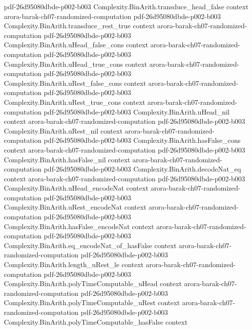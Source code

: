 \begin{theorem}
  {pdf-26d95080dbde-p002-b003}
\proofstep
  {Complexity.BinArith.transduce_head_false}
  {context}
  {arora-barak-ch07-randomized-computation}
  {pdf-26d95080dbde-p002-b003}
\proofstep
  {Complexity.BinArith.transduce_rest_true}
  {context}
  {arora-barak-ch07-randomized-computation}
  {pdf-26d95080dbde-p002-b003}
\proofstep
  {Complexity.BinArith.uHead_false_cons}
  {context}
  {arora-barak-ch07-randomized-computation}
  {pdf-26d95080dbde-p002-b003}
\proofstep
  {Complexity.BinArith.uHead_true_cons}
  {context}
  {arora-barak-ch07-randomized-computation}
  {pdf-26d95080dbde-p002-b003}
\proofstep
  {Complexity.BinArith.uRest_false_cons}
  {context}
  {arora-barak-ch07-randomized-computation}
  {pdf-26d95080dbde-p002-b003}
\proofstep
  {Complexity.BinArith.uRest_true_cons}
  {context}
  {arora-barak-ch07-randomized-computation}
  {pdf-26d95080dbde-p002-b003}
\proofstep
  {Complexity.BinArith.uHead_nil}
  {context}
  {arora-barak-ch07-randomized-computation}
  {pdf-26d95080dbde-p002-b003}
\proofstep
  {Complexity.BinArith.uRest_nil}
  {context}
  {arora-barak-ch07-randomized-computation}
  {pdf-26d95080dbde-p002-b003}
\proofstep
  {Complexity.BinArith.hasFalse_cons}
  {context}
  {arora-barak-ch07-randomized-computation}
  {pdf-26d95080dbde-p002-b003}
\proofstep
  {Complexity.BinArith.hasFalse_nil}
  {context}
  {arora-barak-ch07-randomized-computation}
  {pdf-26d95080dbde-p002-b003}
\proofstep
  {Complexity.BinArith.decodeNat_eq}
  {context}
  {arora-barak-ch07-randomized-computation}
  {pdf-26d95080dbde-p002-b003}
\proofstep
  {Complexity.BinArith.uHead_encodeNat}
  {context}
  {arora-barak-ch07-randomized-computation}
  {pdf-26d95080dbde-p002-b003}
\proofstep
  {Complexity.BinArith.uRest_encodeNat}
  {context}
  {arora-barak-ch07-randomized-computation}
  {pdf-26d95080dbde-p002-b003}
\proofstep
  {Complexity.BinArith.hasFalse_encodeNat}
  {context}
  {arora-barak-ch07-randomized-computation}
  {pdf-26d95080dbde-p002-b003}
\proofstep
  {Complexity.BinArith.eq_encodeNat_of_hasFalse}
  {context}
  {arora-barak-ch07-randomized-computation}
  {pdf-26d95080dbde-p002-b003}
\proofstep
  {Complexity.BinArith.length_uRest_le}
  {context}
  {arora-barak-ch07-randomized-computation}
  {pdf-26d95080dbde-p002-b003}
\proofstep
  {Complexity.BinArith.polyTimeComputable_uHead}
  {context}
  {arora-barak-ch07-randomized-computation}
  {pdf-26d95080dbde-p002-b003}
\proofstep
  {Complexity.BinArith.polyTimeComputable_uRest}
  {context}
  {arora-barak-ch07-randomized-computation}
  {pdf-26d95080dbde-p002-b003}
\proofstep
  {Complexity.BinArith.polyTimeComputable_hasFalse}
  {context}

\end{theorem}
